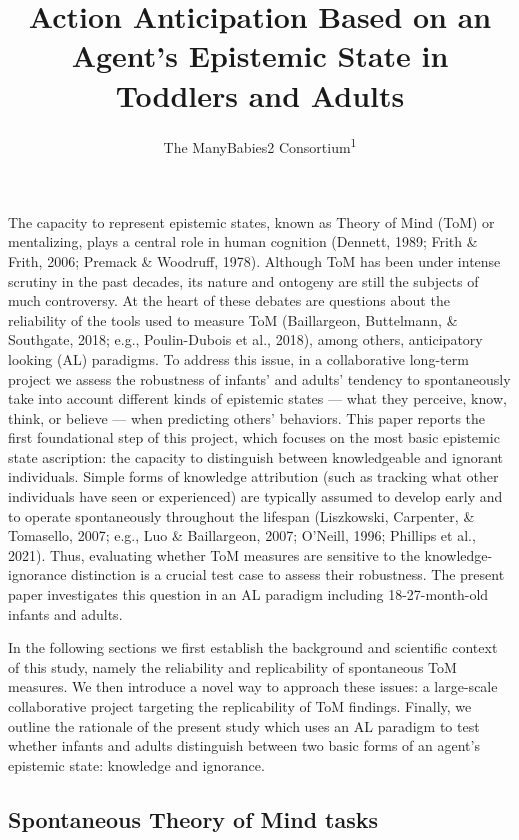 \documentclass[
  man,floatsintext]{apa6}
\title{Action Anticipation Based on an Agent's Epistemic State in Toddlers and Adults}
\author{The ManyBabies2 Consortium\textsuperscript{1}}
\date{}
\affiliation{\vspace{0.5cm}\textsuperscript{1} See author note}
\begin{document}
\maketitle

The capacity to represent epistemic states, known as Theory of Mind (ToM) or mentalizing, plays a central role in human cognition (Dennett, 1989; Frith \& Frith, 2006; Premack \& Woodruff, 1978). Although ToM has been under intense scrutiny in the past decades, its nature and ontogeny are still the subjects of much controversy. At the heart of these debates are questions about the reliability of the tools used to measure ToM (Baillargeon, Buttelmann, \& Southgate, 2018; e.g., Poulin-Dubois et al., 2018), among others, anticipatory looking (AL) paradigms. To address this issue, in a collaborative long-term project we assess the robustness of infants' and adults' tendency to spontaneously take into account different kinds of epistemic states --- what they perceive, know, think, or believe --- when predicting others' behaviors. This paper reports the first foundational step of this project, which focuses on the most basic epistemic state ascription: the capacity to distinguish between knowledgeable and ignorant individuals. Simple forms of knowledge attribution (such as tracking what other individuals have seen or experienced) are typically assumed to develop early and to operate spontaneously throughout the lifespan (Liszkowski, Carpenter, \& Tomasello, 2007; e.g., Luo \& Baillargeon, 2007; O'Neill, 1996; Phillips et al., 2021). Thus, evaluating whether ToM measures are sensitive to the knowledge-ignorance distinction is a crucial test case to assess their robustness. The present paper investigates this question in an AL paradigm including 18-27-month-old infants and adults.

In the following sections we first establish the background and scientific context of this study, namely the reliability and replicability of spontaneous ToM measures. We then introduce a novel way to approach these issues: a large-scale collaborative project targeting the replicability of ToM findings. Finally, we outline the rationale of the present study which uses an AL paradigm to test whether infants and adults distinguish between two basic forms of an agent's epistemic state: knowledge and ignorance.

\subsection{Spontaneous Theory of Mind tasks}\label{spontaneous-theory-of-mind-tasks}
\end{document}
